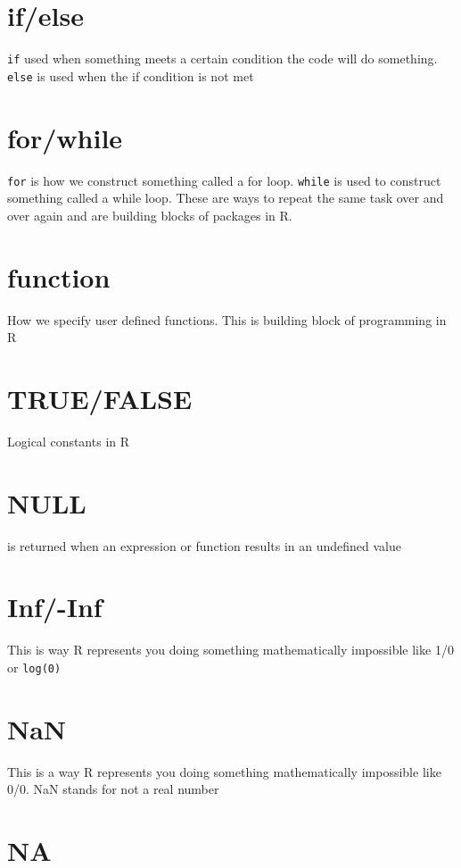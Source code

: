\documentclass[
  letterpaper,
  DIV=11,
  numbers=noendperiod,
  oneside]{scrreprt}
\begin{document}
\section{if/else}

\texttt{if} used when something meets a certain condition the code will
do something. \texttt{else} is used when the if condition is not met

\section{for/while}

\texttt{for} is how we construct something called a for loop.
\texttt{while} is used to construct something called a while loop. These
are ways to repeat the same task over and over again and are building
blocks of packages in R.

\section{function}

How we specify user defined functions. This is building block of
programming in R

\section{TRUE/FALSE}

Logical constants in R

\section{NULL}

is returned when an expression or function results in an undefined value

\section{Inf/-Inf}

This is way R represents you doing something mathematically impossible
like 1/0 or \texttt{log(0)}

\section{NaN}

This is a way R represents you doing something mathematically impossible
like 0/0. NaN stands for not a real number

\section{NA}
\end{document}
